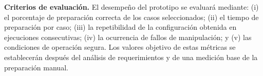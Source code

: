 \textbf{Criterios de evaluación.} El desempeño del prototipo se evaluará mediante: (i) el porcentaje de preparación correcta de los casos seleccionados; (ii) el tiempo de preparación por caso; (iii) la repetibilidad de la configuración obtenida en ejecuciones consecutivas; (iv) la ocurrencia de fallos de manipulación; y (v) las condiciones de operación segura. Los valores objetivo de estas métricas se establecerán después del análisis de requerimientos y de una medición base de la preparación manual.
